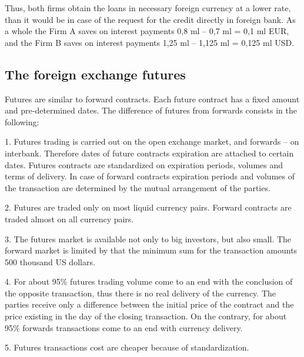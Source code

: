 \documentclass[international_finance_p1.tex]{subfiles}
\begin{document}
\begin{frame}
Thus, both firms obtain the loans in necessary foreign currency at a lower rate, than it would be in case of the request for the credit directly in foreign bank. As a whole the Firm A saves on interest payments 0,8 ml – 0,7 ml = 0,1 ml EUR, and the Firm B saves on interest payments 1,25 ml – 1,125 ml = 0,125 ml USD.
\end{frame}

\subsection{The foreign exchange futures}
\begin{frame}
Futures are similar to forward contracts. Each future contract has a fixed amount and pre-determined dates. The difference of futures from forwards consists in the following:

1. Futures trading is carried out on the open exchange market, and forwards – on interbank. Therefore dates of future contracts expiration are attached to certain dates. Futures contracts are standardized on expiration periods, volumes and terms of delivery. In case of forward contracts expiration periods and volumes of the transaction are determined by the mutual arrangement of the parties.

2. Futures are traded only on most liquid currency pairs. Forward contracts are traded almost on all currency pairs.
\end{frame}
\begin{frame}
3. The futures market is available not only to big investors, but also small. The forward market is limited by that the minimum sum for the transaction amounts 500 thousand US dollars.

4. For about 95\% futures trading volume come to an end with the conclusion of the opposite transaction, thus there is no real delivery of the currency. The parties receive only a difference between the initial price of the contract and the price existing in the day of the closing transaction. On the contrary, for about 95\% forwards transactions come to an end with currency delivery.

5. Futures transactions cost are cheaper because of standardization.

\end{frame}
\end{document}
